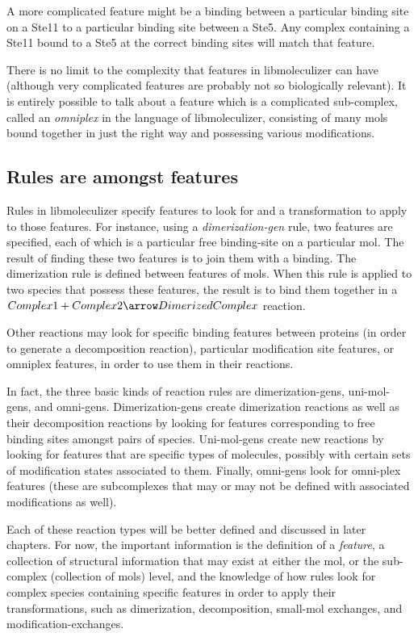 A more complicated feature might be a binding between a particular binding
site on a Ste11 to a particular binding site between a Ste5.  Any
complex containing a Ste11 bound to a Ste5 at the correct binding
sites will match that feature.  

There is no limit to the complexity that features in libmoleculizer
can have (although very complicated features are probably not so
biologically relevant).  It is entirely possible to talk about a
feature which is a complicated sub-complex, called an {\it omniplex}
in the language of libmoleculizer, consisting of many mols bound
together in just the right way and possessing various modifications.

\subsection{Rules are amongst features}

Rules in libmoleculizer specify features to look for and a
transformation to apply to those features.  For instance, using a {\it
  dimerization-gen} rule, two features are specified, each of which is
a particular free binding-site on a particular mol.  The result of
finding these two features is to join them with a binding.  The
dimerization rule is defined between features of mols.  When this rule
is applied to two species that possess these features, the result is
to bind them together in a $Complex1 + Complex2 \arrow
DimerizedComplex$ reaction.  

Other reactions may look for specific binding features between
proteins (in order to generate a decomposition reaction), particular
modification site features, or omniplex features, in order to use them
in their reactions.

In fact, the three basic kinds of reaction rules are
dimerization-gens, uni-mol-gens, and omni-gens. Dimerization-gens
create dimerization reactions as well as their decomposition
reactions by looking for features corresponding to free binding sites
amongst pairs of species.  Uni-mol-gens create new reactions by
looking for features that are specific types of molecules, possibly
with certain sets of modification states associated to them.  Finally,
omni-gens look for omni-plex features (these are subcomplexes that may
or may not be defined with associated modifications as well).  

Each of these reaction types will be better defined and discussed in
later chapters.  For now, the important information is the definition
of a {\it feature}, a collection of structural information that may
exist at either the mol, or the sub-complex (collection of mols)
level, and the knowledge of how rules look for complex species
containing specific features in order to apply their transformations,
such as dimerization, decomposition, small-mol exchanges, and
modification-exchanges.  


